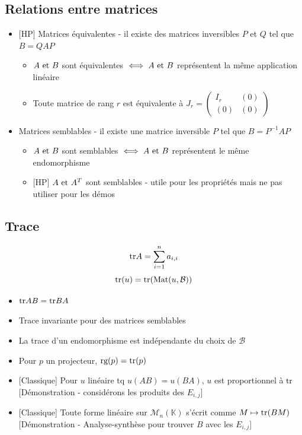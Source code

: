 \documentclass[openany]{book}
\begin{document}
\subsection{Relations entre matrices}
\begin{itemize}
    \item{} [HP] Matrices équivalentes - il existe des matrices inversibles $P$ et $Q$ tel que $B = QAP$
    \begin{itemize}
        \item $A \text{ et } B$ sont équivalentes $\iff A \text{ et } B$ représentent la même application linéaire
        \item Toute matrice de rang $r$ est équivalente à $J_r = \begin{pmatrix}
            I_r & (0) \\
            (0) & (0)
        \end{pmatrix}$
    \end{itemize} 
    \item Matrices semblables - il existe une matrice inversible $P$ tel que $B = P^{-1}AP$
    \begin{itemize}
        \item $A \text{ et } B$ sont semblables $\iff A \text{ et } B$ représentent le même endomorphisme
        \item{} [HP] $A \text{ et } A^T$ sont semblables - utile pour les propriétés mais ne pas utiliser pour les démos
    \end{itemize} 
\end{itemize}

\subsection{Trace}
\[ \text{tr} A = \sum_{i=1}^n a_{i, i} \]
\[ \text{tr} (u) = \text{tr}( \text{Mat} (u, \mathcal{B}) ) \]

\begin{itemize}
    \item $\text{tr} AB = \text{tr} BA$
    \item Trace invariante pour des matrices semblables
    \item La trace d'un endomorphisme est indépendante du choix de $\mathcal{B}$
    \item Pour $p$ un projecteur, $\text{rg} (p) = \text{tr} (p)$
    \item{} [Classique] Pour $u$ linéaire tq $u(AB) = u(BA)$, $u$ est proportionnel à $\text{tr}$ [Démonstration - considérons les produits des $E_{i, j}$]
    \item{} [Classique] Toute forme linéaire sur $\mathcal{M}_n(\mathbb{K})$ s'écrit comme $M \mapsto \text{tr}(BM)$ [Démonstration - Analyse-synthèse pour trouver $B$ avec les $E_{i, j}$]
\end{itemize}
\end{document}
